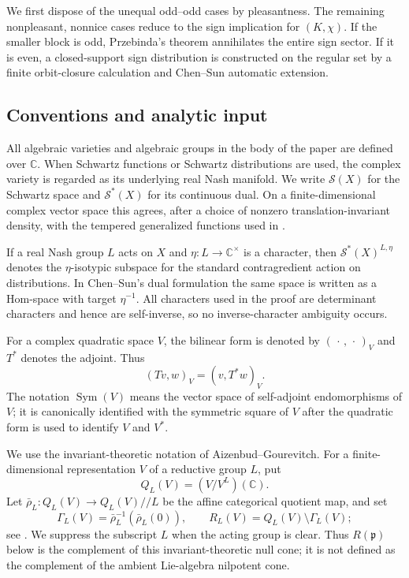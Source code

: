 \documentclass[10pt,a4paper]{amsart}
\numberwithin{equation}{section}
\newcommand{\C}{\mathbb C}
\newcommand{\Sym}{\operatorname{Sym}}
\newcommand{\fp}{\mathfrak p}
\newcommand{\cS}{\mathcal S}
\begin{document}
We first dispose of the unequal odd--odd cases by pleasantness.  The
remaining nonpleasant, nonnice cases reduce to the sign implication for
$(K,\chi)$.  If the smaller
block is odd, Przebinda's theorem annihilates the entire sign sector.  If it is
even, a closed-support sign distribution is constructed on the regular set by
a finite orbit-closure calculation and Chen--Sun automatic extension.
\subsection{Conventions and analytic input}\label{spin:sec:conventions}

All algebraic varieties and algebraic groups in the body of the paper are
defined over $\C$.  When Schwartz functions or Schwartz distributions are
used, the complex variety is regarded as its underlying real Nash manifold.
We write $\cS(X)$ for the Schwartz space and $\cS^*(X)$ for its continuous
dual.  On a finite-dimensional complex vector space this agrees, after a
choice of nonzero translation-invariant density, with the tempered generalized
functions used in \cite{JSZ}.

If a real Nash group $L$ acts on $X$ and $\eta:L\to\C^\times$ is a character,
then $\cS^*(X)^{L,\eta}$ denotes the $\eta$-isotypic subspace for the standard
contragredient action on distributions.  In Chen--Sun's dual formulation the
same space is written as a Hom-space with target $\eta^{-1}$.  All characters
used in the proof are determinant characters and hence are self-inverse, so no
inverse-character ambiguity occurs.

For a complex quadratic space $V$, the bilinear form is denoted by
$(\,\cdot\,,\,\cdot\,)_V$ and $T^*$ denotes the adjoint.  Thus
\[
  (Tv,w)_V=(v,T^*w)_V.
\]
The notation $\Sym(V)$ means the vector space of self-adjoint endomorphisms of
$V$; it is canonically identified with the symmetric square of $V$ after the
quadratic form is used to identify $V$ and $V^*$.

We use the invariant-theoretic notation of Aizenbud--Gourevitch.  For a
finite-dimensional representation $V$ of a reductive group $L$, put
\[
  Q_L(V)=(V/V^L)(\C).
\]
Let $\bar\rho_L:Q_L(V)\to Q_L(V)/\!/L$ be the affine categorical quotient
map, and set
\[
  \Gamma_L(V)=\bar\rho_L^{-1}(\bar\rho_L(0)),
  \qquad
  R_L(V)=Q_L(V)\setminus\Gamma_L(V);
\]
see \cite[Notation~2.3.10]{AG09}.  We suppress the subscript $L$ when the
acting group is clear.  Thus $R(\fp)$ below is the complement of this
invariant-theoretic null cone; it is not defined as the complement of the
ambient Lie-algebra nilpotent cone.
\end{document}
